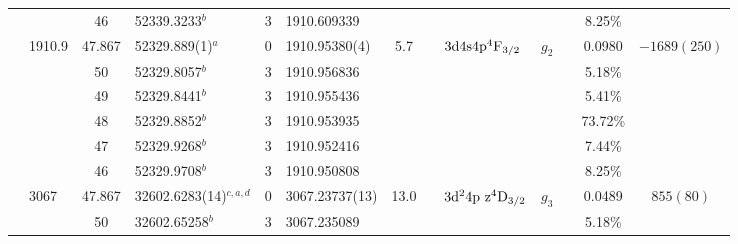 \begin{table*}
\begin{center}
{\begin{tabular}{:l;l;c;l;c;l;c;l;l;c;c;c;c}
\rowstyle{\itshape}               &        & 46        & 52339.3233$^{b}$                 & 3 &   1910.609339      &      & $                                        $ & $                                        $ & $      $ &              & 8.25\%    & $          $\\
                                  & 1910.9 & 47.867    & 52329.889(1)$^{a}$               & 0 &    1910.95380(4)   &  5.7 & $                                        $ & $3\rm{d}4\rm{s}4\rm{p}^4\rm{F}_{3/2}     $ & $g_{2} $ &              & 0.0980    & $-1689(250)$\\
\rowstyle{\itshape}               &        & 50        & 52329.8057$^{b}$                 & 3 &   1910.956836      &      & $                                        $ & $                                        $ & $      $ &              & 5.18\%    & $          $\\
\rowstyle{\itshape}               &        & 49        & 52329.8441$^{b}$                 & 3 &   1910.955436      &      & $                                        $ & $                                        $ & $      $ &              & 5.41\%    & $          $\\
\rowstyle{\itshape}               &        & 48        & 52329.8852$^{b}$                 & 3 &   1910.953935      &      & $                                        $ & $                                        $ & $      $ &              & 73.72\%   & $          $\\
\rowstyle{\itshape}               &        & 47        & 52329.9268$^{b}$                 & 3 &   1910.952416      &      & $                                        $ & $                                        $ & $      $ &              & 7.44\%    & $          $\\
\rowstyle{\itshape}               &        & 46        & 52329.9708$^{b}$                 & 3 &   1910.950808      &      & $                                        $ & $                                        $ & $      $ &              & 8.25\%    & $          $\\
                                  & 3067   & 47.867    & 32602.6283(14)$^{c,a,d}$         & 0 &    3067.23737(13)  & 13.0 & $                                        $ & $3\rm{d}^24\rm{p~z}^4\rm{D}_{3/2}        $ & $g_{3} $ &              & 0.0489    & $  855(80) $\\
\rowstyle{\itshape}               &        & 50        & 32602.65258$^{b}$                & 3 &   3067.235089      &      & $                                        $ & $                                        $ & $      $ &              & 5.18\%    & $          $\\

\end{tabular}}
\end{center}
\end{table*}
